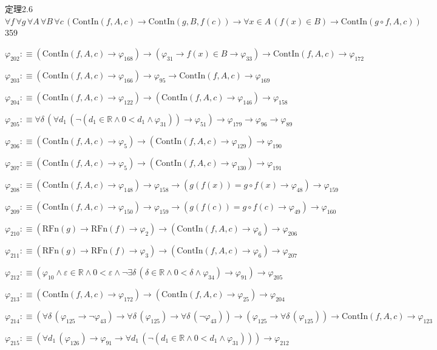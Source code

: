 \begin{fullproof}{定理2.6}{$\forall f\,\forall g\,\forall A\,\forall B\,\forall c\,(\mathrm{ContIn}(f,A,c) \to \mathrm{ContIn}(g,B,f(c)) \to \forall x \in A\,(f(x) \in B) \to \mathrm{ContIn}(g \circ f,A,c))$}{359}
\begin{abbrevlist}
\item $\varphi_{202} :\equiv (\mathrm{ContIn}(f,A,c) \to \varphi_{168}) \to (\varphi_{31} \to f(x) \in B \to \varphi_{33}) \to \mathrm{ContIn}(f,A,c) \to \varphi_{172}$
\item $\varphi_{203} :\equiv (\mathrm{ContIn}(f,A,c) \to \varphi_{166}) \to \varphi_{95} \to \mathrm{ContIn}(f,A,c) \to \varphi_{169}$
\item $\varphi_{204} :\equiv (\mathrm{ContIn}(f,A,c) \to \varphi_{122}) \to (\mathrm{ContIn}(f,A,c) \to \varphi_{146}) \to \varphi_{158}$
\item $\varphi_{205} :\equiv \forall \delta\,(\forall d_{1}\,(\neg (d_{1} \in \mathbb{R} \land 0 < d_{1} \land \varphi_{31})) \to \varphi_{51}) \to \varphi_{179} \to \varphi_{96} \to \varphi_{89}$
\item $\varphi_{206} :\equiv (\mathrm{ContIn}(f,A,c) \to \varphi_{5}) \to (\mathrm{ContIn}(f,A,c) \to \varphi_{129}) \to \varphi_{190}$
\item $\varphi_{207} :\equiv (\mathrm{ContIn}(f,A,c) \to \varphi_{5}) \to (\mathrm{ContIn}(f,A,c) \to \varphi_{130}) \to \varphi_{191}$
\item $\varphi_{208} :\equiv (\mathrm{ContIn}(f,A,c) \to \varphi_{148}) \to \varphi_{158} \to (g(f(x)) = g \circ f(x) \to \varphi_{48}) \to \varphi_{159}$
\item $\varphi_{209} :\equiv (\mathrm{ContIn}(f,A,c) \to \varphi_{150}) \to \varphi_{159} \to (g(f(c)) = g \circ f(c) \to \varphi_{49}) \to \varphi_{160}$
\item $\varphi_{210} :\equiv (\mathrm{RFn}(g) \to \mathrm{RFn}(f) \to \varphi_{2}) \to (\mathrm{ContIn}(f,A,c) \to \varphi_{6}) \to \varphi_{206}$
\item $\varphi_{211} :\equiv (\mathrm{RFn}(g) \to \mathrm{RFn}(f) \to \varphi_{3}) \to (\mathrm{ContIn}(f,A,c) \to \varphi_{6}) \to \varphi_{207}$
\item $\varphi_{212} :\equiv (\varphi_{10} \land \varepsilon \in \mathbb{R} \land 0 < \varepsilon \land \neg \exists \delta\,(\delta \in \mathbb{R} \land 0 < \delta \land \varphi_{34}) \to \varphi_{91}) \to \varphi_{205}$
\item $\varphi_{213} :\equiv (\mathrm{ContIn}(f,A,c) \to \varphi_{172}) \to (\mathrm{ContIn}(f,A,c) \to \varphi_{25}) \to \varphi_{204}$
\item $\varphi_{214} :\equiv (\forall \delta\,(\varphi_{125} \to \neg \varphi_{43}) \to \forall \delta\,(\varphi_{125}) \to \forall \delta\,(\neg \varphi_{43})) \to (\varphi_{125} \to \forall \delta\,(\varphi_{125})) \to \mathrm{ContIn}(f,A,c) \to \varphi_{123}$
\item $\varphi_{215} :\equiv (\forall d_{1}\,(\varphi_{126}) \to \varphi_{91} \to \forall d_{1}\,(\neg (d_{1} \in \mathbb{R} \land 0 < d_{1} \land \varphi_{31}))) \to \varphi_{212}$
\end{abbrevlist}
\end{fullproof}

